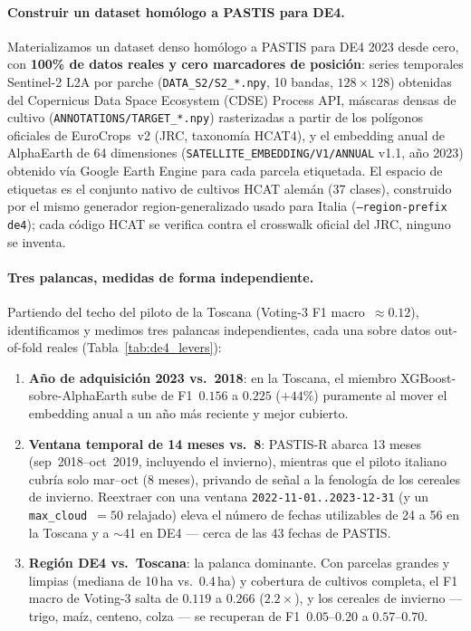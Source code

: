 \paragraph{Construir un dataset homólogo a PASTIS para DE4.}
Materializamos un dataset denso homólogo a PASTIS para DE4 2023 desde
cero, con \textbf{100\% de datos reales y cero marcadores de posición}:
series temporales Sentinel-2 L2A por parche
(\texttt{DATA\_S2/S2\_*.npy}, 10 bandas, $128\times128$) obtenidas del
Copernicus Data Space Ecosystem (CDSE) Process API, máscaras densas de
cultivo (\texttt{ANNOTATIONS/TARGET\_*.npy}) rasterizadas a partir de los
polígonos oficiales de EuroCrops~v2 (JRC, taxonomía HCAT4), y el
embedding anual de AlphaEarth de 64 dimensiones
(\texttt{SATELLITE\_EMBEDDING/V1/ANNUAL} v1.1, año 2023) obtenido vía
Google Earth Engine para cada parcela etiquetada. El espacio de
etiquetas es el conjunto nativo de cultivos HCAT alemán (37 clases),
construido por el mismo generador region-generalizado usado para Italia
(\texttt{--region-prefix de4}); cada código HCAT se verifica contra el
crosswalk oficial del JRC, ninguno se inventa.

\paragraph{Tres palancas, medidas de forma independiente.}
Partiendo del techo del piloto de la Toscana (Voting-3 F1
macro~$\approx0.12$), identificamos y medimos tres palancas
independientes, cada una sobre datos out-of-fold reales
(Tabla~\ref{tab:de4_levers}):
\begin{enumerate}[leftmargin=1.4em,itemsep=2pt]
  \item \textbf{Año de adquisición 2023 vs.\ 2018}: en la Toscana, el
    miembro XGBoost-sobre-AlphaEarth sube de F1~$0.156$ a $0.225$
    ($+44\%$) puramente al mover el embedding anual a un año más reciente
    y mejor cubierto. %
  \item \textbf{Ventana temporal de 14 meses vs.\ 8}: PASTIS-R abarca 13
    meses (sep~2018--oct~2019, incluyendo el invierno), mientras que el
    piloto italiano cubría solo mar--oct (8 meses), privando de señal a
    la fenología de los cereales de invierno. Reextraer con una ventana
    \texttt{2022-11-01..2023-12-31} (y un \texttt{max\_cloud}~$=50$
    relajado) eleva el número de fechas utilizables de 24 a 56 en la
    Toscana y a $\sim$41 en DE4 --- cerca de las 43 fechas de PASTIS.
  \item \textbf{Región DE4 vs.\ Toscana}: la palanca dominante. Con
    parcelas grandes y limpias (mediana de 10\,ha vs.\ 0.4\,ha) y
    cobertura de cultivos completa, el F1 macro de Voting-3 salta de
    $0.119$ a $0.266$ ($2.2\times$), y los cereales de invierno --- trigo,
    maíz, centeno, colza --- se recuperan de F1~$0.05$--$0.20$ a
    $0.57$--$0.70$. %
\end{enumerate}

